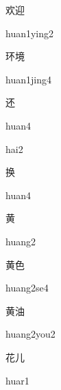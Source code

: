 \begin{verbete}{欢迎}
\begin{pronuncia}{huan1ying2}
\end{pronuncia}
\end{verbete}

\begin{verbete}{环境}
\begin{pronuncia}{huan1jing4}
\end{pronuncia}
\end{verbete}

\begin{verbete}[huan4]{还}
\begin{pronuncia}{huan4}
\end{pronuncia}
\begin{pronuncia}{hai2}
\end{pronuncia}
\end{verbete}

\begin{verbete}[huan4]{换}
\begin{pronuncia}{huan4}
\end{pronuncia}
\end{verbete}

\begin{verbete}[huang2]{黄}
\begin{pronuncia}{huang2}
\end{pronuncia}
\end{verbete}

\begin{verbete}[huang2se4]{黄色}
\begin{pronuncia}{huang2se4}
\end{pronuncia}
\end{verbete}

\begin{verbete}{黄油}
\begin{pronuncia}{huang2you2}
\end{pronuncia}
\end{verbete}

\begin{verbete}[huar1]{花儿}
\begin{pronuncia}{huar1}
\end{pronuncia}
\end{verbete}

